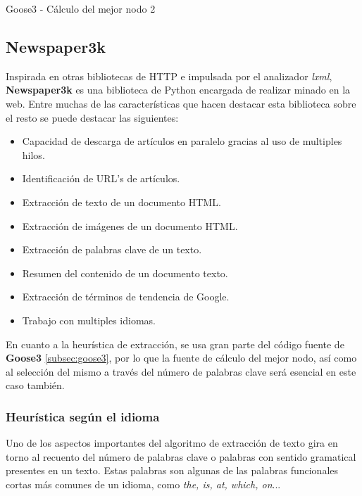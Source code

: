 \begin{codefloat}
  
  \caption{Goose3 - Cálculo del mejor nodo 2}
  \label{cod:goose3 - calculo del mejor nodo 2}
\end{codefloat}

\subsection{Newspaper3k}
\label{subsec:newspaper3k}

Inspirada en otras bibliotecas de HTTP e impulsada por el analizador \emph{lxml}, \textbf{Newspaper3k}
\cite{newspaper3k} es una biblioteca de Python encargada de realizar minado en la web. Entre muchas de las
características que hacen destacar esta biblioteca sobre el resto se puede destacar las siguientes:

\begin{itemize}
  \item Capacidad de descarga de artículos en paralelo gracias al uso de multiples hilos.
  \item Identificación de URL's de artículos.
  \item Extracción de texto de un documento HTML.
  \item Extracción de imágenes de un documento HTML.
  \item Extracción de palabras clave de un texto.
  \item Resumen del contenido de un documento texto.
  \item Extracción de términos de tendencia de Google.
  \item Trabajo con multiples idiomas.
\end{itemize}

En cuanto a la heurística de extracción, se usa gran parte del código fuente de \textbf{Goose3} 
\ref{subsec:goose3}, por lo que la fuente de cálculo del mejor nodo, así como al selección del mismo a 
través del número de palabras clave será esencial en este caso también.

\subsubsection{Heurística según el idioma}
\label{subsubsec:heuristica segun el idioma}

Uno de los aspectos importantes del algoritmo de extracción de texto gira en torno al recuento del número 
de palabras clave o palabras con sentido gramatical presentes en un texto. Estas palabras son algunas de 
las palabras funcionales cortas más comunes de un idioma, como \emph{the, is, at, which, on}... 

